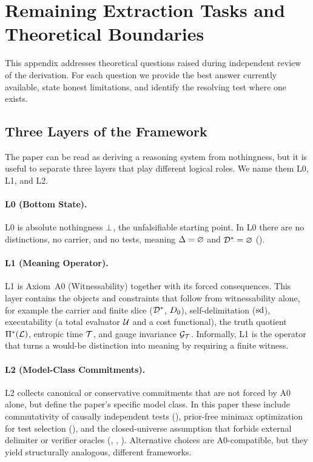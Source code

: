 \section{Remaining Extraction Tasks and Theoretical Boundaries}
\label{app:open-questions}

This appendix addresses theoretical questions raised during independent
review of the derivation.  For each question we provide the best answer
currently available, state honest limitations, and identify the
resolving test where one exists.

\subsection{Three Layers of the Framework}
\label{app:oq:layers}

The paper can be read as deriving a reasoning system from nothingness, but
it is useful to separate three layers that play different logical roles.
We name them L0, L1, and L2.

\paragraph{L0 (Bottom State).}
L0 is absolute nothingness $\bot$, the unfalsifiable starting point.  In
L0 there are no distinctions, no carrier, and no tests, meaning
$\Delta = \varnothing$ and $\mathcal{D}^* = \varnothing$ ().

\paragraph{L1 (Meaning Operator).}
L1 is Axiom~A0 (Witnessability) together with its forced consequences.
This layer contains the objects and constraints that follow from
witnessability alone, for example the carrier and finite slice
($\mathcal{D}^*$, $D_0$), self-delimitation ($\mathrm{sd}$), executability
(a total evaluator $\mathcal{U}$ and a cost functional), the truth quotient
$\Pi^*(\mathcal{L})$, entropic time $\mathcal{T}$, and gauge invariance $\mathcal{G}_{\mathcal{T}}$.  Informally, L1 is the
operator that turns a would-be distinction into meaning by requiring a
finite witness.

\paragraph{L2 (Model-Class Commitments).}
L2 collects canonical or conservative commitments that are not forced by A0
alone, but define the paper's specific model class.  In this paper these
include commutativity of causally independent tests (), prior-free
minimax optimization for test selection (), and the closed-universe
assumption that forbids external delimiter or verifier oracles
(, , ).  Alternative choices are A0-compatible,
but they yield structurally analogous, different frameworks.

